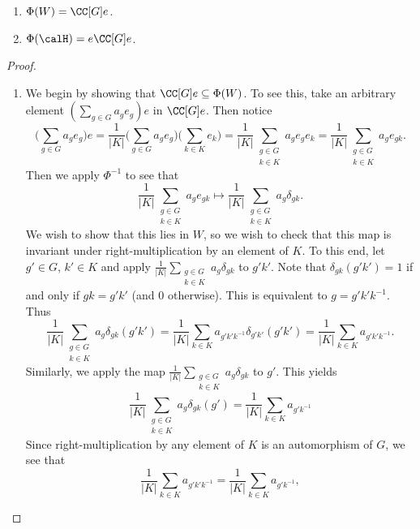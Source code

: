 \begin{prop}
	\begin{enumerate}[\itshape(i)]
		\item $\Phi(W) = \CC[G]e$.
		\item $\Phi(\calH) = e \CC[G] e$.
	\end{enumerate}
\end{prop}
\begin{proof}
	\begin{enumerate}[\itshape(i)]
		\item We begin by showing that $\CC[G]e\subseteq \Phi(W)$.
		      To see this, take an arbitrary element $(\sum_{g\in G} a_ge_g)e$ in $\CC[G]e$.
		      Then notice
		      \[
			      \bigg(\sum_{g\in G} a_ge_g\bigg)e = \frac{1}{|K|}\bigg(\sum_{g\in G} a_ge_g\bigg)\bigg(\sum_{k\in K}e_k\bigg) = \frac{1}{|K|}\sum_{\substack{g\in G \\ k\in K}} a_ge_ge_k = \frac{1}{|K|}\sum_{\substack{g\in G \\ k\in K}} a_ge_{gk}.
		      \]
		      Then we apply $\Phi^{-1}$ to see that
		      \[
			      \frac{1}{|K|}\sum_{\substack{g\in G \\ k\in K}} a_ge_{gk} \mapsto \frac{1}{|K|}\sum_{\substack{g\in G \\ k\in K}} a_g\delta_{gk}.
		      \]
		      We wish to show that this lies in $W$, so we wish to check that this map is invariant under right-multiplication by an element of $K$.
		      To this end, let $g'\in G$, $k'\in K$ and apply $\frac{1}{|K|}\sum_{\substack{g\in G \\ k\in K}} a_g\delta_{gk}$ to $g'k'$.
		      Note that $\delta_{gk}(g'k')=1$ if and only if $gk=g'k'$ (and $0$ otherwise).
		      This is equivalent to $g=g'k'k^{-1}$.
		      Thus
		      \[
			      \frac{1}{|K|}\sum_{\substack{g\in G \\ k\in K}} a_g\delta_{gk}(g'k') = \frac{1}{|K|}\sum_{k\in K} a_{g'k'k^{-1}}\delta_{g'k'}(g'k') = \frac{1}{|K|}\sum_{k\in K} a_{g'k'k^{-1}}.
		      \]
		      Similarly, we apply the map $\frac{1}{|K|}\sum_{\substack{g\in G \\ k\in K}} a_g\delta_{gk}$ to $g'$.
		      This yields
		      \[
			      \frac{1}{|K|}\sum_{\substack{g\in G \\ k\in K}} a_g\delta_{gk}(g') = \frac{1}{|K|}\sum_{k\in K} a_{g'k^{-1}}
		      \]
		      Since right-multiplication by any element of $K$ is an automorphism of $G$, we see that
		      \[
			      \frac{1}{|K|}\sum_{k\in K} a_{g'k'k^{-1}}=\frac{1}{|K|}\sum_{k\in K} a_{g'k^{-1}},
		      \]

\end{enumerate}
\end{proof}
